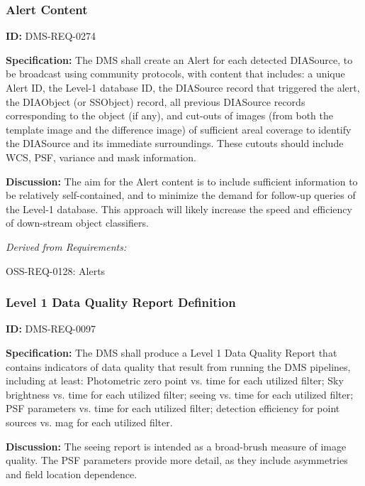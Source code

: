 \documentclass[SE,toc,lsstdraft]{lsstdoc}
\begin{document}
\subsubsection{Alert Content}

\label{DMS-REQ-0274}
\textbf{ID:} DMS-REQ-0274

\textbf{Specification:} The DMS shall create an Alert for each detected DIASource, to be broadcast using community protocols, with content that includes: a unique Alert ID, the Level-1 database ID, the DIASource record that triggered the alert, the DIAObject (or SSObject) record, all previous DIASource records corresponding to the object (if any), and cut-outs of images (from both the template image and the difference image) of sufficient areal coverage to identify the DIASource and its immediate surroundings. These cutouts should include WCS, PSF, variance and mask information.

\textbf{Discussion: }The aim for the Alert content is to include sufficient information to be relatively self-contained, and to minimize the demand for follow-up queries of the Level-1 database. This approach will likely increase the speed and efficiency of down-stream object classifiers.




\emph{Derived from Requirements:}

OSS-REQ-0128:
Alerts \newline


\subsubsection{Level 1 Data Quality Report Definition}

\label{DMS-REQ-0097}
\textbf{ID:} DMS-REQ-0097

\textbf{Specification:} The DMS shall produce a Level 1 Data Quality Report that contains indicators of data quality that result from running the DMS pipelines, including at least: Photometric zero point vs. time for each utilized filter; Sky brightness vs. time for each utilized filter; seeing vs. time for each utilized filter; PSF parameters vs. time for each utilized filter; detection efficiency for point sources vs. mag for each utilized filter.

\textbf{Discussion:} The seeing report is intended as a broad-brush measure of image quality.  The PSF parameters provide more detail, as they include asymmetries and field location dependence.
\end{document}
